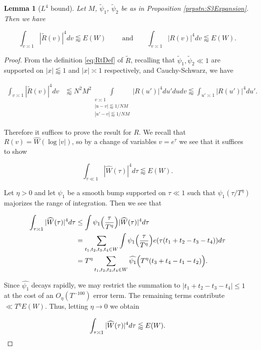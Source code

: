 \documentclass{amsart}
\theoremstyle{plain}
\newtheorem{lmm}[thrm]{Lemma}
\numberwithin{equation}{section}
\renewcommand{\tilde}{\widetilde}
\begin{document}
%
%

\begin{lmm}[$L^4$ bound] \label{RL4}
Let $M$, $\tilde{\psi}_1$, $\tilde{\psi}_2$ be as in Proposition \ref{prpstn:S3Expansion}. Then we have

\[  \int_{v \asymp 1} |\tilde{R}(v)|^4 dv \lessapprox E(W)\qquad \text{ and} \qquad \int_{v \asymp 1} |R(v)|^4 dv \lessapprox E(W).  \]

\end{lmm}

%
%

\begin{proof} 
From the definition \eqref{eq:RtDef} of $\tilde{R}$, recalling that $\tilde{\psi}_1,\tilde{\psi}_2\ll 1$ are supported on $|x|\lessapprox 1$ and $|x|\asymp 1$ respectively, and Cauchy-Schwarz, we have

\begin{align*}
\int_{v\asymp 1}|\tilde{R}(v)|^4dv&\lessapprox N^2M^2  \int\limits_{\substack{v\asymp 1\\ |u-v|\lessapprox 1/NM\\ |u'-v|\lessapprox 1/NM}}   |R(u')|^4 du'   du dv\lessapprox \int_{u'\asymp 1}|R(u')|^4 du'.
\end{align*}

Therefore it suffices to prove the result for $R$. We recall that $R(v)=\widehat{W}(\log{|v|})$, so by a change of variables $v=e^\tau$ we see that it suffices to show

\[
\int_{\tau\ll 1}|\widehat{W}(\tau)|^4d\tau\lessapprox E(W).
\]

Let $\eta>0$ and let $\psi_1$ be a smooth bump supported on $\tau\ll 1$ such that $\psi_1(\tau/T^\eta)$ majorizes the range of integration. Then we see that

\begin{align*}
\int_{\tau\asymp 1}|\widehat{W}(\tau)|^4d\tau&\le \int \psi_1\Bigl(\frac{\tau}{T^\eta}\Bigr)|\widehat{W}(\tau)|^4d\tau\\
&=\sum_{t_1,t_2,t_3,t_4\in W}\int \psi_1\Bigl(\frac{\tau}{T^\eta}\Bigr)e(\tau(t_1+t_2-t_3-t_4))d\tau\\
&=T^\eta \sum_{t_1,t_2,t_3,t_4\in W} \widehat{\psi_1}\Bigl(T^\eta(t_3+t_4-t_1-t_2)\Bigr).
\end{align*}

Since $\widehat{\psi_1}$ decays rapidly, we may restrict the summation to $|t_1+t_2-t_3-t_4|\le 1$ at the cost of an $O_\eta(T^{-100})$ error term. The remaining terms contribute $\ll T^\eta E(W)$. Thus, letting $\eta\rightarrow 0$ we obtain

\[
\int_{\tau\asymp 1}|\widehat{W}(\tau)|^4d\tau\lessapprox E(W).\qedhere
\]

\end{proof}
\end{document}
